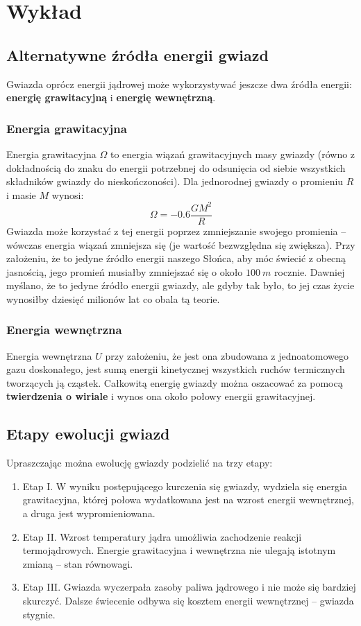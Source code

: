 \documentclass[../index.tex]{subfiles}
\begin{document}
    \section{Wykład}
        \subsection{Alternatywne źródła energii gwiazd}
            Gwiazda oprócz energii jądrowej może wykorzystywać jeszcze dwa źródła energii: \textbf{energię grawitacyjną} i \textbf{energię wewnętrzną}.
            \subsubsection{Energia grawitacyjna}
                Energia grawitacyjna \(\Omega\) to energia wiązań grawitacyjnych masy gwiazdy (równo z dokładnością do znaku do energii potrzebnej do odsunięcia od siebie wszystkich składników gwiazdy do nieskończoności). Dla jednorodnej gwiazdy o promieniu \(R\) i masie \(M\) wynosi:
                \begin{equation}
                    \Omega = - 0.6 \frac{GM^2 }{R} 
                \end{equation}
                Gwiazda może korzystać z tej energii poprzez zmniejszanie swojego promienia – wówczas energia wiązań zmniejsza się (je wartość bezwzględna się zwiększa). Przy założeniu, że to jedyne źródło energii naszego Słońca, aby móc świecić z obecną jasnością, jego promień musiałby zmniejszać się o około \(100\:m\) rocznie. Dawniej myślano, że to jedyne źródło energii gwiazdy, ale gdyby tak było, to jej czas życie wynosiłby dziesięć milionów lat co obala tą teorie.
            \subsubsection{Energia wewnętrzna}
                Energia wewnętrzna \(U\) przy założeniu, że jest ona zbudowana z jednoatomowego gazu doskonałego, jest sumą energii kinetycznej wszystkich ruchów termicznych tworzących ją cząstek. Całkowitą energię gwiazdy można oszacować za pomocą \textbf{twierdzenia o wiriale} i wynos ona około połowy energii grawitacyjnej.
        \subsection{Etapy ewolucji gwiazd}
            Upraszczając można ewolucję gwiazdy podzielić na trzy etapy:
            \begin{enumerate}
                \item Etap I. W wyniku postępującego kurczenia się gwiazdy, wydziela się energia grawitacyjna, której połowa wydatkowana jest na wzrost energii wewnętrznej, a druga jest wypromieniowana.
                \item Etap II. Wzrost temperatury jądra umożliwia zachodzenie reakcji termojądrowych. Energie grawitacyjna i wewnętrzna nie ulegają istotnym zmianą – stan równowagi.
                \item Etap III. Gwiazda wyczerpała zasoby paliwa jądrowego i nie może się bardziej skurczyć. Dalsze świecenie odbywa się kosztem energii wewnętrznej – gwiazda stygnie.
            \end{enumerate}
\end{document}
